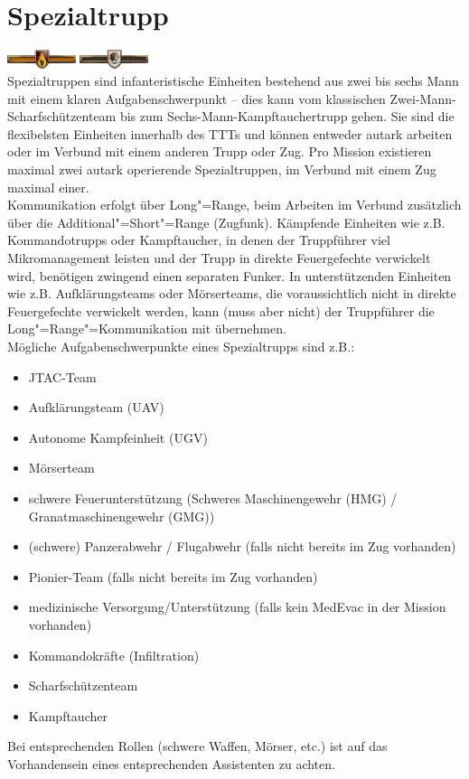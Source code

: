 \section{Spezialtrupp}
\includegraphics[width=20mm]{./img/truppenordnung/spezialeinheiten/sf1}\quad
\includegraphics[width=20mm]{./img/truppenordnung/spezialeinheiten/sf2}\\
Spezialtruppen sind infanteristische Einheiten bestehend aus zwei bis sechs Mann mit einem klaren Aufgabenschwerpunkt -- dies kann vom klassischen Zwei-Mann-Scharfschützenteam bis zum Sechs-Mann-Kampftauchertrupp gehen. Sie sind die flexibelsten Einheiten innerhalb des TTTs und können entweder autark arbeiten oder im Verbund mit einem anderen Trupp oder Zug. Pro Mission existieren maximal zwei autark operierende Spezialtruppen, im Verbund mit einem Zug maximal einer.\\
Kommunikation erfolgt über Long"=Range, beim Arbeiten im Verbund zusätzlich über die Additional"=Short"=Range (Zugfunk). Kämpfende Einheiten wie z.B. Kommandotrupps oder Kampftaucher, in denen der Truppführer viel Mikromanagement leisten und der Trupp in direkte Feuergefechte verwickelt wird, benötigen zwingend einen separaten Funker. In unterstützenden Einheiten wie z.B. Aufklärungsteams oder Mörserteams, die voraussichtlich nicht in direkte Feuergefechte verwickelt werden, kann (muss aber nicht) der Truppführer die Long"=Range"=Kommunikation mit übernehmen.\\
Mögliche Aufgabenschwerpunkte eines Spezialtrupps sind z.B.:

\begin{itemize}
	\setlength\itemsep{0em}
	\item JTAC-Team
	\item Aufklärungsteam (UAV)
	\item Autonome Kampfeinheit (UGV)
	\item Mörserteam
	\item schwere Feuerunterstützung (Schweres Maschinengewehr (HMG) / Granatmaschinengewehr (GMG))
	\item (schwere) Panzerabwehr / Flugabwehr (falls nicht bereits im Zug vorhanden)
	\item Pionier-Team (falls nicht bereits im Zug vorhanden)
	\item medizinische Versorgung/Unterstützung (falls kein MedEvac in der Mission vorhanden)
	\item Kommandokräfte (Infiltration)
	\item Scharfschützenteam
	\item Kampftaucher
\end{itemize}
Bei entsprechenden Rollen (schwere Waffen, Mörser, etc.) ist auf das Vorhandensein eines entsprechenden Assistenten zu achten.
